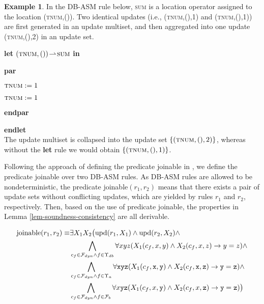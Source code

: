 \documentclass[preprint,11pt]{elsarticle}
\theoremstyle{definition}
\newtheorem{example}{Example}[section]
\theoremstyle{remark}
\begin{document}
\begin{example}

In the DB-ASM rule below, \textsc{sum} is a location operator assigned to the location (\textsc{tnum},()). Two identical updates (i.e., (\textsc{tnum},(),1) and (\textsc{tnum},(),1)) are first
generated in an update multiset, and then aggregated into one update (\textsc{tnum},(),2) in an update set.

\vspace{3.5cm}
 \hspace{2.5cm}\textbf{let} $(\textsc{tnum},())
\!\rightharpoonup\! \textsc{sum}$ \textbf{in}

\hspace{3cm}\textbf{par}

\hspace{3.5cm} $\textsc{tnum}:=1$

\hspace{3.5cm} $\textsc{tnum}:= 1$

\hspace{3cm}\textbf{endpar}

\hspace{2.5cm}\textbf{endlet}\\[0.2cm]
The update multiset is collapsed into the update set $\{ (\textsc{tnum},(),2) \}$, whereas without the \textbf{let} rule we would obtain $\{ (\textsc{tnum},(),1) \}$.

\end{example}

Following the approach of defining the predicate joinable in
\cite{RobertLogicASM}, we define the predicate joinable over two
DB-ASM rules. As DB-ASM rules are allowed to be nondeterministic,
the predicate joinable$(r_1,r_2)$ means that there exists a pair of
update sets without conflicting updates, which are yielded by rules
$r_1$ and $r_2$, respectively. Then, based on the use of predicate
joinable, the properties in Lemma \ref{lem-soundness-consistency}
are all derivable.

\begin{equation}\label{joinable}
\begin{split}
\text{joinable}(r_1,r_2) \equiv &  \exists X_1 X_2 \big(\mathrm{upd}(r_1,X_1)\wedge\mathrm{upd}(r_2,X_2)\wedge\hspace{2cm}  \\
  &  \bigwedge\limits_{c_f\in\mathcal{F}_{dyn} \wedge f \in \Upsilon_{db}}\forall x y z (X_1(c_f,x,y)\wedge X_2(c_f,x,z)\rightarrow y=z ) \wedge\\
  &  \bigwedge\limits_{c_f\in\mathcal{F}_{dyn} \wedge f \in \Upsilon_{a}}\forall \mathtt{x} \mathtt{y} \mathtt{z} (X_1(c_f,\mathtt{x},\mathtt{y})\wedge X_2(c_f,\mathtt{x},\mathtt{z})\rightarrow \mathtt{y}=\mathtt{z} ) \wedge\\
  &  \bigwedge\limits_{c_f\in\mathcal{F}_{dyn} \wedge f \in {\cal F}_b}\forall x \mathtt{y} \mathtt{z} (X_1(c_f,x,\mathtt{y})\wedge X_2(c_f,x,\mathtt{z})\rightarrow \mathtt{y}=\mathtt{z} ) \big)
\end{split}
\end{equation}
\end{document}

